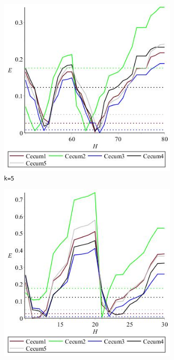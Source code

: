 \documentclass[../../main.tex]{subfiles}
\begin{document}
\begin{figure}[H]
\begin{subfigure}[b]{.45\textwidth}
\includegraphics[width=\textwidth]{precision/minmax/k5cecum}
\caption{\texttt{k=5}}
\end{subfigure}
\begin{subfigure}[b]{.45\textwidth}
\includegraphics[width=\textwidth]{precision/minmax/k6cecum}

\end{subfigure}
\end{figure}
\end{document}
